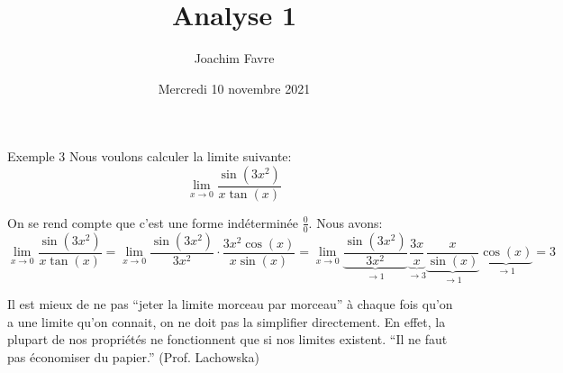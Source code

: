 \documentclass[a4paper]{article}
\title{Analyse 1}
\author{Joachim Favre}
\date{Mercredi 10 novembre 2021}
\begin{document}
\maketitle


\begin{parag}{Exemple 3}
    Nous voulons calculer la limite suivante: 
    \[\lim_{x \to 0} \frac{\sin\left(3x^2\right)}{x\tan\left(x\right)}\]
    
    On se rend compte que c'est une forme indéterminée $\frac{0}{0}$. Nous avons: 
    \[\lim_{x \to 0} \frac{\sin\left(3x^2\right)}{x\tan\left(x\right)} = \lim_{x \to 0} \frac{\sin\left(3x^2\right)}{3x^2}\cdot \frac{3x^2 \cos\left(x\right)}{x\sin\left(x\right)} = \lim_{x \to 0} \underbrace{\frac{\sin\left(3x^2\right)}{3x^2}}_{\to 1} \underbrace{\frac{3x}{x}}_{\to 3} \underbrace{\frac{x}{\sin\left(x\right)}}_{\to 1} \underbrace{\cos\left(x\right)}_{\to 1} = 3\]
    
    Il est mieux de ne pas ``jeter la limite morceau par morceau'' à chaque fois qu'on a une limite qu'on connait, on ne doit pas la simplifier directement. En effet, la plupart de nos propriétés ne fonctionnent que si nos limites existent. ``Il ne faut pas économiser du papier.'' (Prof. Lachowska)
\end{parag}
\end{document}
